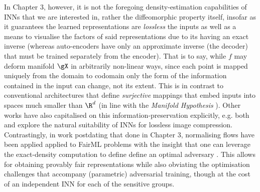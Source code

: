 %
In Chapter 3, however, it is not the foregoing density-estimation capabilities of INNs that we are
interested in, rather the diffeomorphic property itself, insofar as it guarantees the learned
representations are \emph{lossless} \wrt{} the inputs as well as a means to visualise the factors
of said representations due to its having an exact inverse (whereas auto-encoders have only an
approximate inverse (the decoder) that must be trained separately from the encoder).
%
That is to say, while \(f\) may deform manifold \(\gX\) in arbitrarily non-linear ways, since each
point is mapped uniquely from the domain to codomain only the form of the information contained in
the input can change, not its extent. 
%
This is in contrast to conventional architectures that define \emph{surjective} mappings that embed
inputs into spaces much smaller than \(\R^d\) (in line with the \emph{Manifold Hypothesis}
\citep{fefferman2016testing}).
%
Other works have also capitalised on this information-preservation explicitly, e.g. both
\cite{hoogeboom2019integer} and \cite{xie2021enhanced} explore the natural suitability of INNs for
lossless image compression.
%
Contrastingly, in work postdating that done in Chapter 3, normalising flows have been applied
applied to FairML problems with the insight that one can leverage the exact-density computation to
define define an optimal adversary \citep{balunovic2021fair, cerrato2022fair}. 
%
This allows for obtaining provably fair representations while also obviating the optimisation
challenges that accompany (parametric) adversarial training, though at the cost of an independent
INN for each of the sensitive groups.

